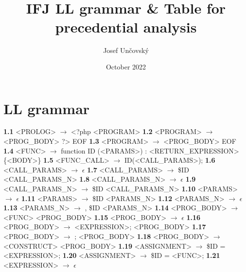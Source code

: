 \documentclass{article}
\title{IFJ LL grammar \& Table for precedential analysis}
\author{Josef Unčovský }
\date{October 2022}
\begin{document}
\maketitle

\section{LL grammar}
\textbf{1.1} <PROLOG> $\rightarrow$ <?php <PROGRAM> \newline
\textbf{1.2} <PROGRAM> $\rightarrow$ <PROG\_BODY>  ?> EOF \newline
\textbf{1.3} <PROGRAM> $\rightarrow$ <PROG\_BODY> EOF \newline
\textbf{1.4} <FUNC> $\rightarrow$ function ID (<PARAMS>) : <RETURN\_EXPRESSION> \{<BODY>\} \newline
\textbf{1.5} <FUNC\_CALL> $\rightarrow$ ID(<CALL\_PARAMS>); \newline
\textbf{1.6} <CALL\_PARAMS> $\rightarrow$ $\epsilon$ \newline
\textbf{1.7} <CALL\_PARAMS> $\rightarrow$ \$ID <CALL\_PARAMS\_N>\newline
\textbf{1.8} <CALL\_PARAMS\_N> $\rightarrow$ $\epsilon$ \newline
\textbf{1.9} <CALL\_PARAMS\_N> $\rightarrow$ \$ID <CALL\_PARAMS\_N> \newline 
\textbf{1.10} <PARAMS> $\rightarrow$ $\epsilon$ \newline
\textbf{1.11} <PARAMS> $\rightarrow$ \$ID <PARAMS\_N> \newline
\textbf{1.12} <PARAMS\_N> $\rightarrow$ $\epsilon$ \newline
\textbf{1.13} <PARAMS\_N> $\rightarrow$ , \$ID <PARAMS\_N> \newline
\textbf{1.14} <PROG\_BODY> $\rightarrow$ <FUNC> <PROG\_BODY> \newline
\textbf{1.15} <PROG\_BODY> $\rightarrow$ $\epsilon$ \newline
\textbf{1.16} <PROG\_BODY> $\rightarrow$ <EXPRESSION>; <PROG\_BODY> \newline
\textbf{1.17} <PROG\_BODY> $\rightarrow$ ; <PROG\_BODY>\newline
\textbf{1.18} <PROG\_BODY> $\rightarrow$ <CONSTRUCT> <PROG\_BODY> \newline
\textbf{1.19} <ASSIGNMENT> $\rightarrow$ \$ID = <EXPRESSION>; \newline
\textbf{1.20} <ASSIGNMENT> $\rightarrow$ \$ID = <FUNC>; \newline
\textbf{1.21} <EXPRESSION> $\rightarrow$ $\epsilon$ \newline
\end{document}
